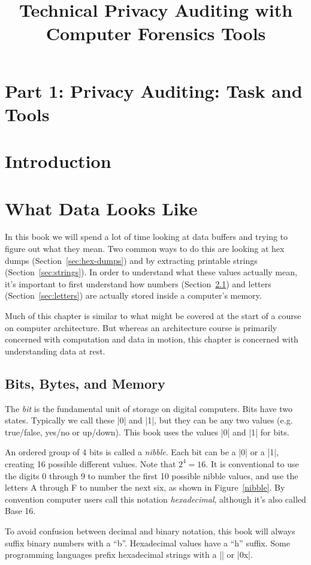 \documentclass[11pt,letter]{book}
\newcommand{\figref}[1]{Figure~\ref{#1}\xspace}
\newcommand{\secref}[1]{Section~\ref{#1}\xspace}
\begin{document}
\title{Technical Privacy Auditing with Computer Forensics Tools}
\chapter*{Part 1: Privacy Auditing: Task and Tools}
\chapter{Introduction}
\chapter{What Data Looks Like}

In this book we will spend a lot of time looking at data buffers and
trying to figure out what they mean. Two common ways to do this are
looking at hex dumps (\secref{sec:hex-dumps}) and by extracting
printable strings (\secref{sec:strings}). In order to understand
what these values actually mean, it's important
to first understand how numbers (\secref{sec:numbers}) and letters
(\secref{sec:letters}) are actually stored inside a computer's memory.

Much of this chapter is similar to what might be covered at the start
of a course on computer architecture. But whereas an architecture
course is primarily concerned with computation and data in motion,
this chapter is concerned with understanding data at rest. 

\section{Bits, Bytes, and Memory}\label{sec:numbers}
The \emph{bit} is the fundamental unit of storage on digital computers. Bits
have two states. Typically we call these |0| and |1|, but they can be any
two values (e.g. true/false, yes/no or up/down). This book 
uses the values |0| and |1| for bits.

An ordered group of 4 bits is called a \emph{nibble}. Each bit can be
a |0| or a |1|, creating 16 possible different values. Note
that $2^4=16$. It is conventional to use the digits 0 through 9 to
number the first 10 possible nibble values, and use the letters A
through F to number the next six, as shown in \figref{nibble}. By
convention computer users call this notation \emph{hexadecimal},
although it's also called Base 16.

To avoid confusion between decimal and binary notation, this book will
always suffix binary numbers with a ``b''. Hexadecimal values have a
``h'' suffix. Some programming languages prefix hexadecimal strings
with a |\x| or |0x|. 
\end{document}

